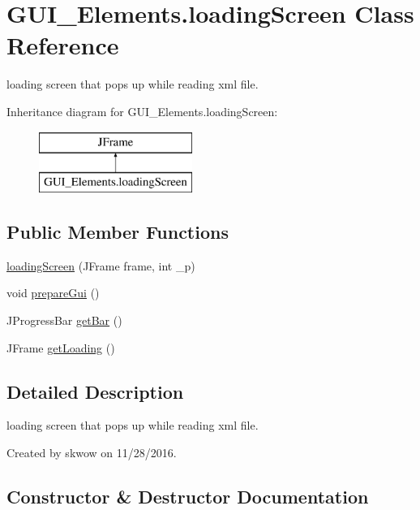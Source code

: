 \hypertarget{class_g_u_i___elements_1_1loading_screen}{}\section{G\+U\+I\+\_\+\+Elements.\+loading\+Screen Class Reference}
\label{class_g_u_i___elements_1_1loading_screen}


loading screen that pops up while reading xml file.  


Inheritance diagram for G\+U\+I\+\_\+\+Elements.\+loading\+Screen\+:\begin{figure}[H]
\begin{center}
\leavevmode
\includegraphics[height=2.000000cm]{class_g_u_i___elements_1_1loading_screen}
\end{center}
\end{figure}
\subsection*{Public Member Functions}
\begin{DoxyCompactItemize}
\item 
\hyperlink{class_g_u_i___elements_1_1loading_screen_a0fc0f5ae4d7ebb422ca36364ccc848b9}{loading\+Screen} (J\+Frame frame, int \+\_\+p)
\item 
void \hyperlink{class_g_u_i___elements_1_1loading_screen_afa7caf6e03de405b8b9c0d6619bac201}{prepare\+Gui} ()
\item 
J\+Progress\+Bar \hyperlink{class_g_u_i___elements_1_1loading_screen_a1cd168a3031086c3d15708213dd11a4b}{get\+Bar} ()
\item 
J\+Frame \hyperlink{class_g_u_i___elements_1_1loading_screen_a565b95f52e78c18e62ccb633ebb9fc49}{get\+Loading} ()
\end{DoxyCompactItemize}


\subsection{Detailed Description}
loading screen that pops up while reading xml file. 

Created by skwow on 11/28/2016. 

\subsection{Constructor \& Destructor Documentation}
\hypertarget{class_g_u_i___elements_1_1loading_screen_a0fc0f5ae4d7ebb422ca36364ccc848b9}{}\label{class_g_u_i___elements_1_1loading_screen_a0fc0f5ae4d7ebb422ca36364ccc848b9} 
